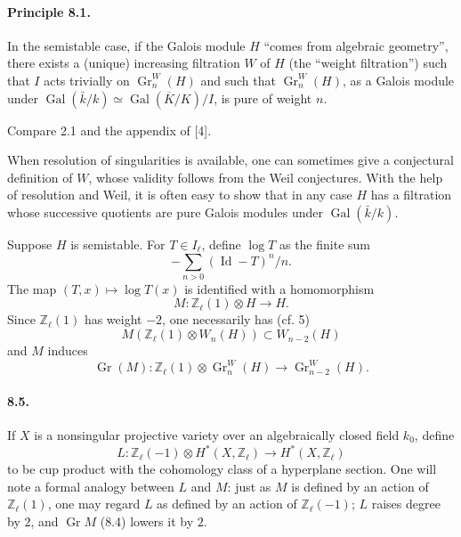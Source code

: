 \documentclass[10pt]{article}
\newcommand{\Zl}{\mathbb Z_\ell}
\newcommand{\Gr}{\operatorname{Gr}}
\newcommand{\Gal}{\operatorname{Gal}}
\newcommand{\Id}{\operatorname{Id}}
\newcommand{\barK}{\overline{K}}
\begin{document}
\paragraph{Principle 8.1.} In the semistable case, if the Galois module $H$ ``comes from algebraic geometry'', there exists a (unique) increasing filtration $W$ of $H$ (the ``weight filtration'') such that $I$ acts trivially on $\Gr_n^W(H)$ and such that $\Gr_n^W(H)$, as a Galois module under $\Gal(\bar k/k)\simeq\Gal(\barK/K)/I$, is pure of weight $n$.

Compare 2.1 and the appendix of [4].

When resolution of singularities is available, one can sometimes give a conjectural definition of $W$, whose validity follows from the Weil conjectures. With the help of resolution and Weil, it is often easy to show that in any case $H$ has a filtration whose successive quotients are pure Galois modules under $\Gal(\bar k/k)$.

Suppose $H$ is semistable. For $T\in I_\ell$, define $\log T$ as the finite sum
\[
-\sum_{n>0}(\Id-T)^n/n.
\]
The map $(T,x)\mapsto\log T(x)$ is identified with a homomorphism
\[
\tag{8.2}
M:\Zl(1)\otimes H\longrightarrow H.
\]
Since $\Zl(1)$ has weight $-2$, one necessarily has (cf. 5)
\[
\tag{8.3}
M(\Zl(1)\otimes W_n(H))\subset W_{n-2}(H)
\]
and $M$ induces
\[
\tag{8.4}
\Gr(M):\Zl(1)\otimes\Gr_n^W(H)\longrightarrow\Gr_{n-2}^W(H).
\]

\paragraph{8.5.} If $X$ is a nonsingular projective variety over an algebraically closed field $k_0$, define
\[
L:\Zl(-1)\otimes H^*(X,\Zl)\longrightarrow H^*(X,\Zl)
\]
to be cup product with the cohomology class of a hyperplane section. One will note a formal analogy between $L$ and $M$: just as $M$ is defined by an action of $\Zl(1)$, one may regard $L$ as defined by an action of $\Zl(-1)$; $L$ raises degree by $2$, and $\Gr M$ (8.4) lowers it by $2$.
\end{document}
